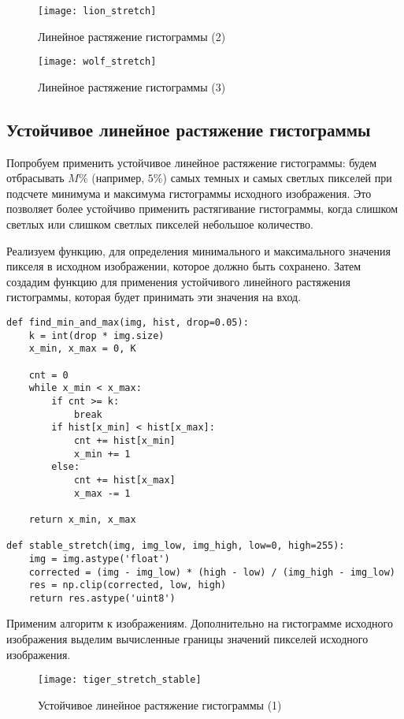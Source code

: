 \begin{figure}[H]
	\centering
	\texttt{[image: lion\_stretch]}
	\caption{Линейное растяжение гистограммы (2)}
\end{figure}

\begin{figure}[H]
	\centering
	\texttt{[image: wolf\_stretch]}
	\caption{Линейное растяжение гистограммы (3)}
\end{figure}

\subsection{Устойчивое линейное растяжение гистограммы}

Попробуем применить устойчивое линейное растяжение гистограммы: будем отбрасывать $M\%$ (например, $5\%$) самых темных и самых светлых пикселей при подсчете минимума и максимума гистограммы исходного изображения. Это позволяет более устойчиво применить растягивание гистограммы, когда слишком светлых или слишком светлых пикселей небольшое количество.

Реализуем функцию, для определения минимального и максимального значения пикселя в исходном изображении, которое должно быть сохранено. Затем создадим функцию для применения устойчивого линейного растяжения гистограммы, которая будет принимать эти значения на вход.

\begin{lstlisting}
def find_min_and_max(img, hist, drop=0.05):    
	k = int(drop * img.size)
	x_min, x_max = 0, K
	
	cnt = 0
	while x_min < x_max:
		if cnt >= k:
			break
		if hist[x_min] < hist[x_max]:
			cnt += hist[x_min]
			x_min += 1
		else:
			cnt += hist[x_max]
			x_max -= 1

	return x_min, x_max

def stable_stretch(img, img_low, img_high, low=0, high=255):
	img = img.astype('float')
	corrected = (img - img_low) * (high - low) / (img_high - img_low)
	res = np.clip(corrected, low, high)
	return res.astype('uint8')
\end{lstlisting}

Применим алгоритм к изображениям. Дополнительно на гистограмме исходного изображения выделим вычисленные границы значений пикселей исходного изображения.

\begin{figure}[H]
	\centering
	\texttt{[image: tiger\_stretch\_stable]}
	\caption{Устойчивое линейное растяжение гистограммы (1)}
\end{figure}

